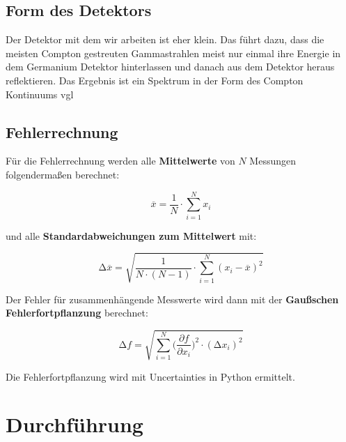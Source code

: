 \subsection{Form des Detektors}
Der Detektor mit dem wir arbeiten ist eher klein.
Das führt dazu, dass die meisten Compton gestreuten Gammastrahlen meist nur einmal ihre Energie in dem
Germanium Detektor hinterlassen und danach aus dem Detektor heraus reflektieren.
Das Ergebnis ist ein Spektrum in der Form des Compton Kontinuums vgl

\subsection{Fehlerrechnung}
Für die Fehlerrechnung werden alle \textbf{Mittelwerte} von $N$ Messungen folgendermaßen berechnet:

\begin{equation}
    \overline{x} = \frac{1}{N} \cdot \sum_{i=1}^N x_i
    \label{eqn:Mittelwert}
\end{equation}

und alle \textbf{Standardabweichungen zum Mittelwert} mit:

\begin{equation}
    \increment\overline{x} = \sqrt{\frac{1}{N\cdot(N-1)}\cdot\sum_{i=1}^N (x_i-\overline{x})^2}
    \label{eqn:St_Mittelwert}
\end{equation}

Der Fehler für zusammenhängende Messwerte wird dann mit der \textbf{Gaußschen Fehlerfortpflanzung} berechnet:

\begin{equation}
    \increment{f} = \sqrt{ \sum_{i = 1}^{N}  \biggl(\frac{\partial{f}}{\partial{x_i}}\biggr)^2\cdot(\increment{x_i})^2}
    \label{eqn:Gauss}
\end{equation}

Die Fehlerfortpflanzung wird mit Uncertainties in Python \cite{uncertainties} ermittelt.


\section{Durchführung}



